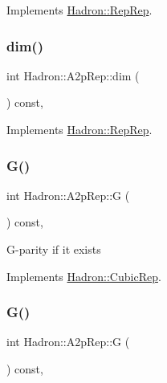 Implements \mbox{\hyperlink{structHadron_1_1RepRep_a92c8802e5ed7afd7da43ccfd5b7cd92b}{Hadron\+::\+Rep\+Rep}}.

\mbox{\label{structHadron_1_1A2pRep_ad62519ad376b83f6d4c434d2f2a01825}} 
\subsubsection{\texorpdfstring{dim()}{dim()}\hspace{0.1cm}{\footnotesize\ttfamily [3/3]}}
{\footnotesize\ttfamily int Hadron\+::\+A2p\+Rep\+::dim (\begin{DoxyParamCaption}{ }\end{DoxyParamCaption}) const\hspace{0.3cm}{\ttfamily [inline]}, {\ttfamily [virtual]}}



Implements \mbox{\hyperlink{structHadron_1_1RepRep_a92c8802e5ed7afd7da43ccfd5b7cd92b}{Hadron\+::\+Rep\+Rep}}.

\mbox{\label{structHadron_1_1A2pRep_a19c098bbb0fcc9aa899231883f4b4ae0}} 
\subsubsection{\texorpdfstring{G()}{G()}\hspace{0.1cm}{\footnotesize\ttfamily [1/2]}}
{\footnotesize\ttfamily int Hadron\+::\+A2p\+Rep\+::G (\begin{DoxyParamCaption}{ }\end{DoxyParamCaption}) const\hspace{0.3cm}{\ttfamily [inline]}, {\ttfamily [virtual]}}

G-\/parity if it exists 

Implements \mbox{\hyperlink{structHadron_1_1CubicRep_a52104e43266d1614c00bbd1c3b395458}{Hadron\+::\+Cubic\+Rep}}.

\mbox{\label{structHadron_1_1A2pRep_a19c098bbb0fcc9aa899231883f4b4ae0}} 
\subsubsection{\texorpdfstring{G()}{G()}\hspace{0.1cm}{\footnotesize\ttfamily [2/2]}}
{\footnotesize\ttfamily int Hadron\+::\+A2p\+Rep\+::G (\begin{DoxyParamCaption}{ }\end{DoxyParamCaption}) const\hspace{0.3cm}{\ttfamily [inline]}, {\ttfamily [virtual]}}

